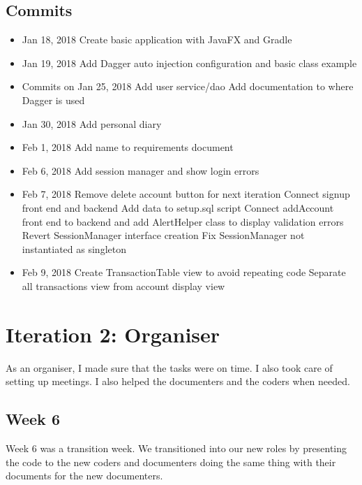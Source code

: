 \documentclass[12pt]{article}
\begin{document}
\subsection{Commits}
\begin{itemize}
    \item Jan 18, 2018
        \subitem [FEAT] Create basic application with JavaFX and Gradle
    \item Jan 19, 2018
        \subitem [FEAT] Add Dagger auto injection configuration and basic class example
    \item Commits on Jan 25, 2018
        \subitem [FEAT] Add user service/dao
        \subitem [DOC] Add documentation to where Dagger is used
    \item Jan 30, 2018
        \subitem [DOC] Add personal diary
    \item Feb 1, 2018
        \subitem [DOC] Add name to requirements document
    \item Feb 6, 2018
        \subitem [FEAT] Add session manager and show login errors
    \item Feb 7, 2018
        \subitem [FIX] Remove delete account button for next iteration
        \subitem [FEAT] Connect signup front end and backend
        \subitem [BUILD] Add data to setup.sql script
        \subitem [FEAT] Connect addAccount front end to backend and add AlertHelper class to display validation errors
        \subitem [REFACTOR] Revert SessionManager interface creation
        \subitem [FIX] Fix SessionManager not instantiated as singleton
    \item Feb 9, 2018
        \subitem [REFACTOR] Create TransactionTable view to avoid repeating code
        \subitem [REFACTOR] Separate all transactions view from account display view
\end{itemize}


\section{Iteration 2: Organiser}
As an organiser, I made sure that the tasks were on time.
I also took care of setting up meetings. I also helped the documenters and the coders when needed.

\subsection{Week 6}
Week 6 was a transition week.
We transitioned into our new roles by presenting the code to the new coders and documenters doing the same thing with their documents for the new documenters.
\end{document}
